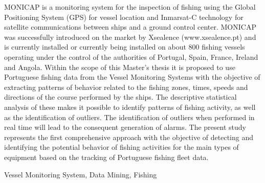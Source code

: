 \abstractEN %

MONICAP is a monitoring system for the inspection of fishing using the Global Positioning System (GPS) for vessel location and Inmarsat-C technology for satellite communications between ships and a ground control center. MONICAP was successfully introduced on the market by Xsealence (www.xsealence.pt) and is currently installed or currently being installed on about 800 fishing vessels operating under the control of the authorities of Portugal, Spain, France, Ireland and Angola. Within the scope of this Master's thesis it is proposed to use Portuguese fishing data from the Vessel Monitoring Systems with the objective of extracting patterns of behavior related to the fishing zones, times, speeds and directions of the course performed by the ships. The descriptive statistical analysis of these makes it possible to identify patterns of fishing activity, as well as the identification of outliers. The identification of outliers when performed in real time will lead to the consequent generation of alarms. The present study represents the first comprehensive approach with the objective of detecting and identifying the potential behavior of fishing activities for the main types of equipment based on the tracking of Portuguese fishing fleet data.

\begin{keywords}
Vessel Monitoring System, Data Mining, Fishing
\end{keywords} 
